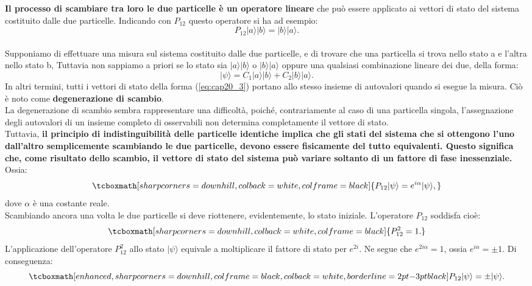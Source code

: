 \textbf{Il processo di scambiare tra loro le due particelle è un operatore lineare} che può essere applicato ai vettori di stato del sistema costituito dalle due particelle. Indicando con $P_{12}$ questo operatore si ha ad esempio:
	\begin{equation}
		P_{12}|a\rangle|b\rangle = |b\rangle|a\rangle.
	\end{equation}\\
	
Supponiamo di effettuare una misura sul sistema costituito dalle due particelle, e di trovare che una particella si trova nello stato a e l'altra nello stato b, Tuttavia non sappiamo a priori se lo stato sia $|a\rangle|b\rangle$ o $|b\rangle|a\rangle$ oppure una qualsiasi combinazione lineare dei due, della forma:
	\begin{equation}
		|\psi\rangle = C_1|a\rangle|b\rangle + C_2 |b\rangle|a\rangle.
	\label{eq:cap20_3}
	\end{equation}
In altri termini, tutti i vettori di stato della forma (\ref{eq:cap20_3}) portano allo stesso insieme di autovalori quando si esegue la misura. Ciò è noto come \textbf{degenerazione di scambio}.\\

La degenerazione di scambio sembra rappresentare una difficoltà, poiché, contrariamente al caso di una particella singola, l'assegnazione degli autovalori di un insieme completo di osservabili non determina completamente il vettore di stato.\\

Tuttavia, \textbf{il principio di indistinguibilità delle particelle identiche implica che gli stati del sistema che si ottengono l'uno dall'altro semplicemente scambiando le due particelle, devono essere fisicamente del tutto equivalenti. Questo significa che, come risultato dello scambio, il vettore di stato del sistema può variare soltanto di un fattore di fase inessenziale.} Ossia:
	\begin{equation}
		\tcboxmath[sharp corners=downhill, colback=white, colframe=black]{
			P_{12}|\psi\rangle =  e^{i\alpha}|\psi\rangle,
			}
	\end{equation}
dove $\alpha$ è una costante reale.\\

Scambiando ancora una volta le due particelle si deve riottenere, evidentemente, lo stato iniziale. L'operatore $P_{12}$ soddisfa cioè:
	\begin{equation}
		\tcboxmath[sharp corners=downhill, colback=white, colframe=black]{
			P_{12}^2 = 1.
			}
	\end{equation}
L'applicazione dell'operatore $P_{12}^2$ allo stato $|\psi\rangle$ equivale a moltiplicare il fattore di stato per $e^{2i}$. Ne segue che $e^{2i\alpha} = 1 $, ossia $e^{i\alpha}=\pm1$. Di conseguenza:
	\begin{equation}
		\tcboxmath[enhanced, sharp corners=downhill, colframe=black, colback=white, borderline={2pt}{-3pt}{black}]{
			P_{12} |\psi\rangle= \pm |\psi\rangle .
			}
	\end{equation}\\
	
